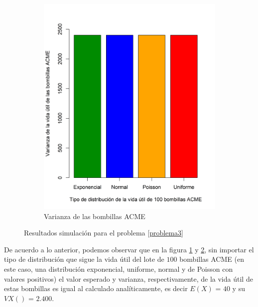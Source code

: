 \documentclass{article}
\begin{document}
\begin{figure}[h]
\begin{center}
\begin{subfigure}[b]{0.45\textwidth}
        \label{bombillasVE}
    \end{subfigure}
    \begin{subfigure}[b]{0.5\textwidth}
        \includegraphics[scale=0.5]{Figures/VarBombillas.png}
        \caption{Varianza de las bombillas ACME}
        \label{bombillasVar}
    \end{subfigure}
    \caption{Resultados simulación para el problema \ref{problema3}}
    \label{bombillas}
    \end{center}
\end{figure}

De acuerdo a lo anterior, podemos observar que en la figura \ref{bombillasVE} y \ref{bombillasVar}, sin importar el tipo de distribución que sigue la vida útil del lote de $100$ bombillas ACME (en este caso, una distribución exponencial, uniforme, normal y de Poisson con valores positivos) el valor esperado y varianza, respectivamente, de la vida útil de estas bombillas es igual al calculado analíticamente, es decir $E{(X)}$ = $40$ y su $V{X()}$ = $2.400$.




\end{document}
